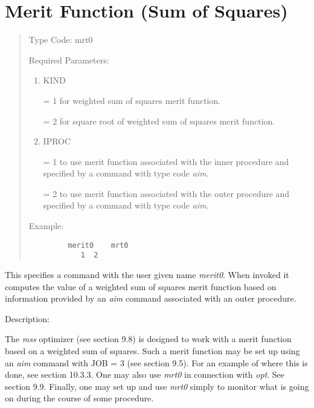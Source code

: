 \section{Merit Function (Sum of Squares)} 
\begin{quotation}
\noindent Type Code:  mrt0
\vspace{5mm}

\noindent Required Parameters:
\begin{enumerate}
\item KIND

= 1 for weighted sum of squares merit function.

= 2 for square root of weighted sum of squares merit function.

       \item IPROC

	    = 1 to use merit function associated with the inner procedure
		and specified \hspace*{1em}by a command with type code {\em
		aim}.

        = 2 to use merit function associated with the outer procedure
		and specified \hspace*{1em}by a command with type code {\em
		aim}.

\end{enumerate}

\vspace{5mm}
\noindent Example:
\begin{verbatim}
         merit0    mrt0
            1  2
\end{verbatim}
\end{quotation}
This specifies a command with the user given name {\em merit0}.  When invoked it computes the value of a weighted sum of squares merit function based on information provided by an {\em aim} command associated with an outer procedure.

\vspace{5mm}
     Description:
\vspace{2mm}

The {\em mss} optimizer (see section 9.8) is designed to work with a merit function based on a weighted sum of squares.  Such a merit function may be set up using an {\em aim} command with JOB = 3 (see section 9.5).  For an example of where this is done, see section 10.3.3.  One may also use {\em mrt0} in connection with {\em opt}.  See section 9.9.  Finally, one may set up and use {\em mrt0} simply to monitor what is going on during the course of some procedure.

